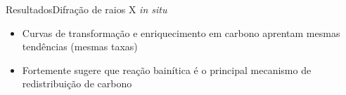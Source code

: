 \begin{frame}{Resultados}{Difração de raios X \textit{in situ}}
	\begin{itemize}
		\item Curvas de transformação e enriquecimento em carbono aprentam mesmas tendências (mesmas taxas)
		\item Fortemente sugere que reação bainítica é o principal mecanismo de redistribuição de carbono
	\end{itemize}
\end{frame}
%
%

%
